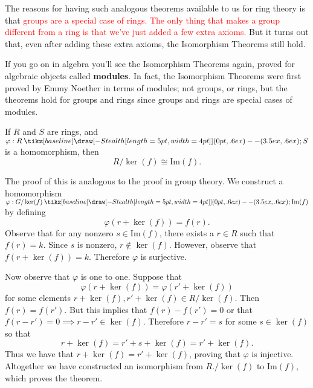 \documentclass[12pt,letterpaper]{algebra_book}
\renewcommand{\to}{\mathbin{\tikz[baseline] \draw[-{Stealth[length=5pt,width=4pt]}] (0pt,.6ex) -- (3.5ex,.6ex);}}
\newcommand{\im}{\mbox{Im}}
\renewcommand{\phi}{\varphi}
\theoremstyle{definition}
\begin{document}
    The reasons for having such analogous theorems available to us
    for ring theory is that \textcolor{Red}{groups are a
    special case of rings. The only thing that makes a group
    different from a ring
    is that we've just added a few extra axioms.} But it turns out
    that, even after adding these extra axioms, the Isomorphism
    Theorems still hold. 

    If you go on in algebra you'll see the Isomorphism Theorems
    again, proved for algebraic objects called \textbf{modules}. In
    fact, the Isomorphism Theorems were first proved by Emmy
    Noether in terms of modules; not groups, or rings, but the
    theorems hold for groups and rings since
    groups and rings are special cases of modules.

    \begin{thm}If $R$ and $S$ are rings, and $\phi: R \to S$ is a
        homomorphism, then 
        \[
            R/\ker(f) \cong \im(f).
        \]
    \end{thm}

    \begin{prf}
        The proof of this is analogous to the proof in group
        theory. We construct a homomorphism $\phi:G/\ker(f) \to
        \im(f)$ by defining 
        \[
            \phi(r + \ker(f)) = f(r).
        \]
        Observe that for any nonzero $s \in \im(f)$, there exists
        a $r \in R$ such that $f(r) = k$. Since $s$ is nonzero, $r
        \not\in \ker(f)$. However, observe that $f(r + \ker(f))
        = k$. Therefore $\phi$ is surjective. 

        Now observe that $\phi$ is one to one. Suppose that 
        \[ 
            \phi(r + \ker(f)) = \phi(r' + \ker(f))
        \] 
        for some elements $r + \ker(f), r' + \ker(f) \in
        R/\ker(f)$. Then $f(r) = f(r')$. But this implies that 
        $f(r) - f(r') = 0$ or that $f(r - r')
        = 0 \implies r-r' \in \ker(f)$. Therefore $r - r' = s$ for
        some $s \in \ker(f)$ so that 
        \[
            r + \ker(f) = r' + s + \ker(f) = r' + \ker(f).
        \]
        Thus we have that $r + \ker(f) = r' + \ker(f)$, proving
        that $\phi$ is injective. Altogether we have constructed
        an isomorphism from $R./\ker(f)$ to $\im(f)$, which proves
        the theorem.
    \end{prf}
\end{document}
